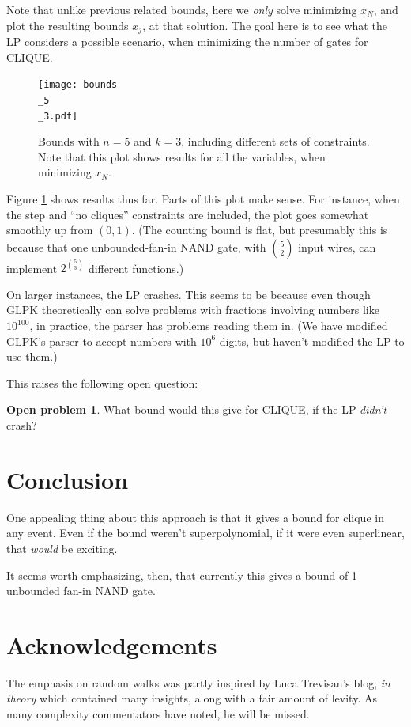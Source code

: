 \documentclass[12pt]{article}
\theoremstyle{definition}
\newtheorem{prob}{Open problem}[section]
\begin{document}
Note that unlike previous related bounds, here we {\em only} solve minimizing
$x_N$, and plot the resulting bounds $x_j$, at that solution. The
goal here is to see what the LP considers a possible scenario, when
minimizing the number of gates for CLIQUE.

\begin{figure}

\centering

\texttt{[image: bounds\\\_5\\\_3.pdf]}

\caption{
Bounds with $n=5$ and $k=3$, including different sets of constraints.
Note that this plot shows results for all the variables, when
minimizing $x_N$.
}
\label{fig:bounds0}

\end{figure}

Figure \ref{fig:bounds0} shows results thus far.
Parts of this plot make sense. For instance, when the
step and ``no cliques'' constraints are included, the
plot goes somewhat smoothly up from $(0,1)$. (The counting
bound is flat, but presumably this is because
that one unbounded-fan-in NAND gate, with ${5 \choose 2}$
input wires, can implement $2^{5 \choose 3}$ different
functions.)

On larger instances, the LP crashes. This seems to be because even
though GLPK theoretically can solve problems with fractions involving
numbers like $10^{100}$, in practice, the parser has problems reading
them in. (We have modified GLPK's parser to accept numbers with $10^6$
digits, but haven't modified the LP to use them.)

This raises the following open question:

\begin{prob}
What bound would this give for CLIQUE, if the LP {\em didn't} crash?
\end{prob}

\section{Conclusion}

One appealing thing about this approach is that it gives a
bound for clique in any event. Even if the bound weren't
superpolynomial, if it were even superlinear, that {\em would} be
exciting.

It seems worth emphasizing, then, that currently this gives a bound
of 1 unbounded fan-in NAND gate.

\section{Acknowledgements}

The emphasis on random walks was partly inspired by Luca Trevisan's
blog, {\em in theory} \cite{luca_trevisan_blog_random_walks_1}
which contained many insights, along with a fair amount of levity.
As many complexity commentators have noted, he will be missed.



\end{document}
